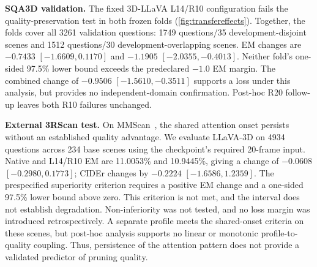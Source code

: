 \textbf{SQA3D validation.} The fixed 3D-LLaVA L14/R10 configuration fails the quality-preservation test in both frozen folds (\cref{fig:transfereffects}). Together, the folds cover all 3261 validation questions: 1749 questions/35 development-disjoint scenes and 1512 questions/30 development-overlapping scenes. EM changes are $-0.7433$ $[-1.6609,0.1170]$ and $-1.1905$ $[-2.0355,-0.4013]$. Neither fold's one-sided 97.5\% lower bound exceeds the predeclared $-1.0$ EM margin. The combined change of $-0.9506$ $[-1.5610,-0.3511]$ supports a loss under this analysis, but provides no independent-domain confirmation. Post-hoc R20 follow-up leaves both R10 failures unchanged.

\textbf{External 3RScan test.} On MMScan~\cite{lyu2024mmscan}, the shared attention onset persists without an established quality advantage. We evaluate LLaVA-3D on 4934 questions across 234 base scenes using the checkpoint's required 20-frame input. Native and L14/R10 EM are 11.0053\% and 10.9445\%, giving a change of $-0.0608$ $[-0.2980,0.1773]$; CIDEr changes by $-0.2224$ $[-1.6586,1.2359]$. The prespecified superiority criterion requires a positive EM change and a one-sided 97.5\% lower bound above zero. This criterion is not met, and the interval does not establish degradation. Non-inferiority was not tested, and no loss margin was introduced retrospectively. A separate profile meets the shared-onset criteria on these scenes, but post-hoc analysis supports no linear or monotonic profile-to-quality coupling. Thus, persistence of the attention pattern does not provide a validated predictor of pruning quality.

